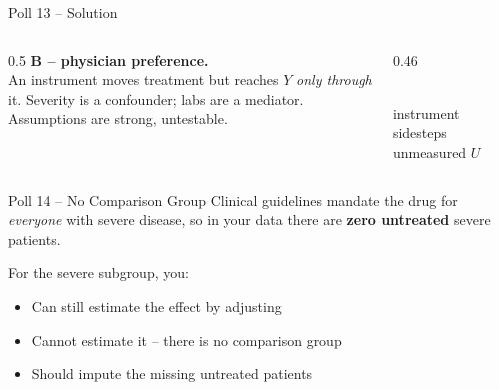 \documentclass[aspectratio=169]{beamer}
\begin{document}
\begin{frame}{Poll 13 \;--\; Solution}
  \small
  \begin{columns}[T]
    \begin{column}{0.5\textwidth}
      \textcolor{good}{\textbf{B -- physician preference.}}\\[0.4em]
      An instrument moves treatment but reaches $Y$ \emph{only through} it.
      Severity is a confounder; labs are a mediator.\\[0.2em]
      \textcolor{brick}{Assumptions are strong, untestable.}
    \end{column}
    \begin{column}{0.46\textwidth}
      \centering
      \\[0.2em]
      {\scriptsize instrument sidesteps unmeasured $U$}
    \end{column}
  \end{columns}
\end{frame}

\begin{frame}{Poll 14 \;--\; No Comparison Group}
  \small
  Clinical guidelines mandate the drug for \emph{everyone} with severe disease,
  so in your data there are \textbf{zero untreated} severe patients.
  \vspace{0.8em}

  For the severe subgroup, you:
  \begin{itemize}
    \item[\textbf{A.}] Can still estimate the effect by adjusting
    \item[\textbf{B.}] Cannot estimate it -- there is no comparison group
    \item[\textbf{C.}] Should impute the missing untreated patients
  \end{itemize}
\end{frame}
\end{document}
